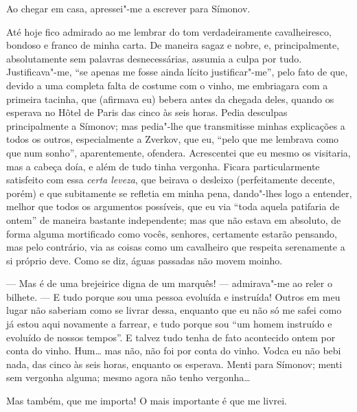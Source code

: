 Ao chegar em casa, apressei"-me a escrever para Símonov.

Até hoje fico admirado ao me lembrar do tom verdadeiramente
cavalheiresco, bondoso e franco de minha carta. De maneira sagaz e
nobre, e, principalmente, absolutamente sem palavras desnecessárias,
assumia a culpa por tudo. Justificava"-me, ``se apenas me fosse ainda
lícito justificar"-me'', pelo fato de que, devido a uma completa falta de
costume com o vinho, me embriagara com a primeira tacinha, que
(afirmava eu) bebera antes da chegada deles, quando os esperava no
Hôtel de Paris das cinco às seis horas. Pedia desculpas
principalmente a Símonov; mas pedia"-lhe que transmitisse minhas
explicações a todos os outros, especialmente a Zverkov, que eu, ``pelo
que me lembrava como que num sonho'', aparentemente, ofendera.
Acrescentei que eu mesmo os visitaria, mas a cabeça doía, e além de
tudo tinha vergonha. Ficara particularmente satisfeito com essa \textit{certa
leveza}, que beirava o desleixo (perfeitamente decente, porém) e que
subitamente se refletia em minha pena, dando"-lhes logo a entender,
melhor que todos os argumentos possíveis, que eu via ``toda aquela
patifaria de ontem'' de maneira bastante independente; mas que não
estava em absoluto, de forma alguma mortificado como vocês, senhores,
certamente estarão pensando, mas pelo contrário, via as coisas como um
cavalheiro que respeita serenamente a si próprio deve. Como se diz,
águas passadas não movem moinho.

--- Mas é de uma brejeirice digna de um marquês! --- admirava"-me ao reler o
bilhete. --- E tudo porque sou uma pessoa evoluída e instruída! Outros em
meu lugar não saberiam como se livrar dessa, enquanto que eu não só me
safei como já estou aqui novamente a farrear, e tudo porque sou ``um
homem instruído e evoluído de nossos tempos''. E talvez tudo tenha de
fato acontecido ontem por conta do vinho. Hum\ldots{} mas não, não foi por
conta do vinho. Vodca eu não bebi nada, das cinco às seis horas,
enquanto os esperava. Menti para Símonov; menti sem vergonha alguma;
mesmo agora não tenho vergonha\ldots{}

Mas também, que me importa! O mais importante é que me livrei.

